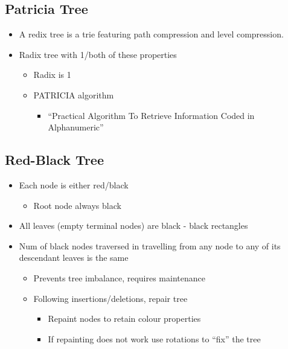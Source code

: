 \subsection{Patricia Tree}

\begin{itemize}
	\item A redix tree is a trie featuring path compression and level
		compression.
	\item Radix tree with 1/both of these properties
	\begin{itemize}
		\item Radix is 1
		\item PATRICIA algorithm
		\begin{itemize}
			\item ``Practical Algorithm To Retrieve Information
				Coded in Alphanumeric''
		\end{itemize}
	\end{itemize}
\end{itemize}

\subsection{Red-Black Tree}

\begin{itemize}
	\item Each node is either red/black
	\begin{itemize}
		\item Root node always black
	\end{itemize}
	\item All leaves (empty terminal nodes) are black - black rectangles
	\item Num of black nodes traversed in travelling from any node to any of
		its descendant leaves is the same
	\begin{itemize}
		\item Prevents tree imbalance, requires maintenance
		\item Following insertions/deletions, repair tree
		\begin{itemize}
			\item Repaint nodes to retain colour properties
			\item If repainting does not work use rotations to
				``fix'' the tree
		\end{itemize}
	\end{itemize}
\end{itemize}
